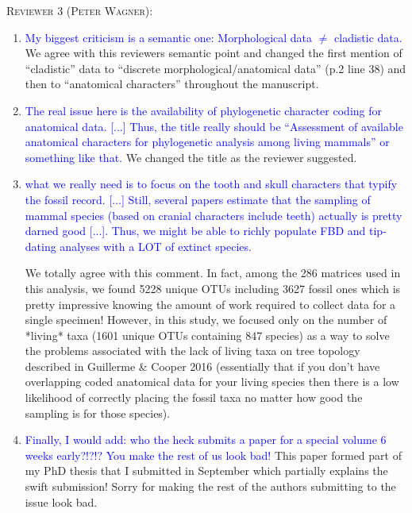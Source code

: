 \documentclass[12pt,letterpaper]{article}
\renewcommand{\section}[1]{%
\bigskip
\begin{center}
\begin{Large}
\normalfont\scshape #1
\medskip
\end{Large}
\end{center}}
\begin{document}
\section{Reviewer 3 (Peter Wagner):}
\begin{enumerate}
\item{\textcolor{blue}{My biggest criticism is a semantic one: Morphological data $\neq$ cladistic data.}}
We agree with this reviewers semantic point and changed the first mention of ``cladistic'' data to ``discrete morphological/anatomical data'' (p.2 line 38) and then to ``anatomical characters'' throughout the manuscript.

\item{\textcolor{blue}{The real issue here is the availability of phylogenetic character coding for anatomical data.
[...] Thus, the title really should be ``Assessment of available anatomical characters for phylogenetic analysis among living mammals'' or something like that.}}
We changed the title as the reviewer suggested.

\item{\textcolor{blue}{what we really need is to focus on the tooth and skull characters that typify the fossil record.
[...] Still, several papers estimate that the sampling of mammal species (based on cranial characters include teeth) actually is pretty darned good [...].
Thus, we might be able to richly populate FBD and tip-dating analyses with a LOT of extinct species.}}

We totally agree with this comment.
In fact, among the 286 matrices used in this analysis, we found 5228 unique OTUs including 3627 fossil ones which is pretty impressive knowing the amount of work required to collect data for a single specimen!
However, in this study, we focused only on the number of *living* taxa (1601 unique OTUs containing 847 species) as a way to solve the problems associated with the lack of living taxa on tree topology described in Guillerme \& Cooper 2016 (essentially that if you don't have overlapping coded anatomical data for your living species then there is a low likelihood of correctly placing the fossil taxa no matter how good the sampling is for those species). 

\item{\textcolor{blue}{Finally, I would add: who the heck submits a paper for a special volume 6 weeks early?!?!? You make the rest of us look bad!}}
This paper formed part of my PhD thesis that I submitted in September which partially explains the swift submission!
Sorry for making the rest of the authors submitting to the issue look bad.

\end{enumerate}
\end{document}
